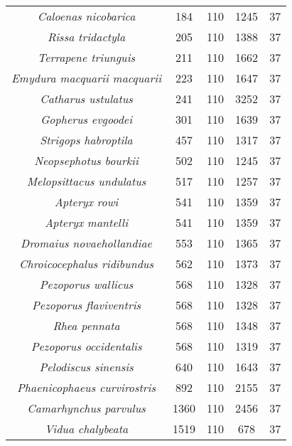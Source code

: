 \begin{longtable}[c]{|c|c|c|c|c|}
\textit{Caloenas nicobarica}          & 184  & 110 & 1245 & 37 \\
\textit{Rissa tridactyla}             & 205  & 110 & 1388 & 37 \\
\textit{Terrapene triunguis}          & 211  & 110 & 1662 & 37 \\
\textit{Emydura macquarii macquarii}  & 223  & 110 & 1647 & 37 \\
\textit{Catharus ustulatus}           & 241  & 110 & 3252 & 37 \\
\textit{Gopherus evgoodei}            & 301  & 110 & 1639 & 37 \\
\textit{Strigops habroptila}          & 457  & 110 & 1317 & 37 \\
\textit{Neopsephotus bourkii}         & 502  & 110 & 1245 & 37 \\
\textit{Melopsittacus undulatus}      & 517  & 110 & 1257 & 37 \\
\textit{Apteryx rowi}                 & 541  & 110 & 1359 & 37 \\
\textit{Apteryx mantelli}             & 541  & 110 & 1359 & 37 \\
\textit{Dromaius novaehollandiae}     & 553  & 110 & 1365 & 37 \\
\textit{Chroicocephalus ridibundus}   & 562  & 110 & 1373 & 37 \\
\textit{Pezoporus wallicus}           & 568  & 110 & 1328 & 37 \\
\textit{Pezoporus flaviventris}       & 568  & 110 & 1328 & 37 \\
\textit{Rhea pennata}                 & 568  & 110 & 1348 & 37 \\
\textit{Pezoporus occidentalis}       & 568  & 110 & 1319 & 37 \\
\textit{Pelodiscus sinensis}          & 640  & 110 & 1643 & 37 \\
\textit{Phaenicophaeus curvirostris}  & 892  & 110 & 2155 & 37 \\
\textit{Camarhynchus parvulus}        & 1360 & 110 & 2456 & 37 \\
\textit{Vidua chalybeata}             & 1519 & 110 & 678  & 37 \\ \hline
\end{longtable}


